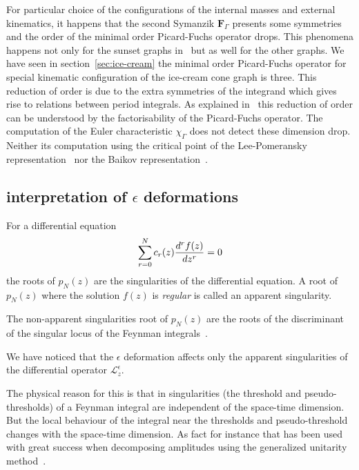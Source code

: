 \documentclass[a4paper,12pt]{article}
\numberwithin{equation}{section}
\numberwithin{figure}{section}
\begin{document}
For particular choice of the configurations of the internal masses and
external kinematics, it happens that the second Symanzik
$\textbf{F}_\Gamma$ presents some symmetries and the order of the
minimal order Picard-Fuchs operator drops.  This phenomena happens not
only for  the sunset graphs
in~\cite{Bloch:2014qca,Lairez:2022zkj,Bonisch:2021yfw,Bonisch:2020qmm,Pogel:2022vat}
but as well for the other graphs. We have seen in section~\ref{sec:ice-cream} the minimal order Picard-Fuchs
operator for special kinematic configuration of the ice-cream cone
graph is three.
This reduction of order is due to the extra symmetries of the
integrand which gives rise to relations between period integrals.
As explained in~\cite{Lairez:2022zkj} this reduction of order can be
understood by the factorisability of the Picard-Fuchs operator.  The
computation of the Euler characteristic $\chi_\Gamma$ does not detect
these dimension drop. Neither its computation using the critical point
of the
Lee-Pomeransky representation~\cite{Lee:2013hzt}   nor the
Baikov representation~\cite{Frellesvig:2017aai,Frellesvig:2019uqt,Cacciatori:2021nli}.

\subsection{interpretation of $\epsilon$ deformations}


For a differential equation
\begin{equation}
	\sum_{r=0}^N c_r(z) {d^rf(z)\over dz^r}=0  
\end{equation}
the roots of $p_N(z)$ are the singularities of the differential
equation. A root of $p_N(z)$ where the solution $f(z)$ is
\emph{regular} is called an apparent singularity.

The non-apparent singularities root of $p_N(z)$ are the roots of the
discriminant of the singular locus of the Feynman integrals~\cite{Doran:2023yzu}.

We have noticed that the $\epsilon$ deformation affects only the
apparent singularities of the differential operator $\mathscr{L}_z^\epsilon$.

The physical reason for this is that in singularities (the threshold
and pseudo-thresholds) of a Feynman integral are independent of the
space-time dimension.  But the local behaviour of the integral near
the thresholds and pseudo-threshold changes with the space-time
dimension.   As fact for instance that has been used with great success
when decomposing amplitudes using the generalized unitarity method~\cite{Bern:2011qt}.
\end{document}
